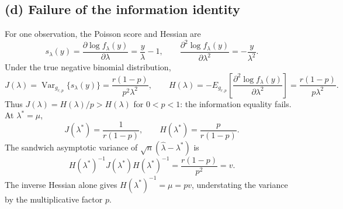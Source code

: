 \subsection*{(d) Failure of the information identity}
For one observation, the Poisson score and Hessian are
\[
s_\lambda(y)=\frac{\partial\log f_\lambda(y)}{\partial\lambda}
=\frac y\lambda-1,\qquad
\frac{\partial^2\log f_\lambda(y)}{\partial\lambda^2}
=-\frac y{\lambda^2}.
\]
Under the true negative binomial distribution,
\[
J(\lambda)=\operatorname{Var}_{g_{r,p}}\{s_\lambda(y)\}
=\frac{r(1-p)}{p^2\lambda^2},\qquad
H(\lambda)=-E_{g_{r,p}}\left[
\frac{\partial^2\log f_\lambda(y)}{\partial\lambda^2}\right]
=\frac{r(1-p)}{p\lambda^2}.
\]
Thus $J(\lambda)=H(\lambda)/p>H(\lambda)$ for $0<p<1$:
the information equality fails.
At $\lambda^*=\mu$,
\[
J(\lambda^*)=\frac1{r(1-p)},\qquad
H(\lambda^*)=\frac p{r(1-p)}.
\]
The sandwich asymptotic variance of
$\sqrt n(\widehat\lambda-\lambda^*)$ is
\[
H(\lambda^*)^{-1}J(\lambda^*)H(\lambda^*)^{-1}
=\frac{r(1-p)}{p^2}=v.
\]
The inverse Hessian alone gives $H(\lambda^*)^{-1}=\mu=pv$,
understating the variance by the multiplicative factor $p$.
